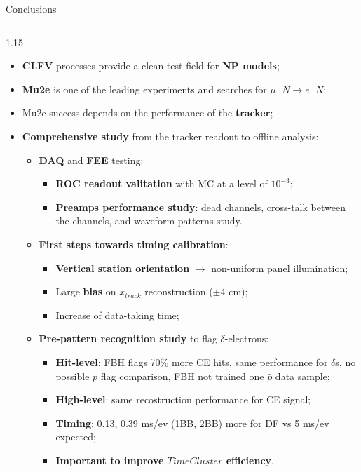 \documentclass{beamer}
\begin{document}
\begin{frame}{Conclusions}
\vspace{-4mm}
\begin{columns}
\begin{column}{1.15\framewidth}
 \setlength{\leftmargini}{1.2em}
    \begin{itemize}
\item \textbf{CLFV} processes provide a clean test field for \textbf{NP models};
\item \textbf{Mu2e} is one of the leading experiments and searches for $\mu^- N \rightarrow e^- N$;
\item Mu2e success depends on the performance of the \textbf{tracker};
    \item \textbf{Comprehensive study} from the tracker readout to offline analysis:
   \begin{itemize}
      \vspace{0.7mm}
   \item \textbf{DAQ} and \textbf{FEE} testing:
   \vspace{0.4mm}
      \begin{itemize}
          
     
    \item \textbf{ROC readout valitation} with MC at a level of $10^{-3}$;
    \item \textbf{Preamps performance study}: dead channels, 
cross-talk between the channels, and waveform patterns study.
 \end{itemize}
    \vspace{0.7mm}
 \item \textbf{First steps towards timing calibration}:
  \vspace{0.4mm}
 \begin{itemize}
     \item \textbf{Vertical station orientation} $\rightarrow$ non-uniform panel illumination;
     \item Large \textbf{bias} on $x_{track}$ reconstruction ($\pm$4 cm);
     \item Increase of data-taking time;
 \end{itemize}
   \vspace{0.7mm}
 \item \textbf{Pre-pattern recognition study} to flag $\delta$-electrons:
  \vspace{0.4mm}
  \begin{itemize}
  \item \textbf{Hit-level}: FBH flags 70\% more CE hits, same performance for $\delta$s, no possible $p$ flag comparison, FBH not trained one $\bar{p}$ data sample;
  \item \textbf{High-level}: same recostruction performance for CE signal;
  \item  \textbf{Timing}: 0.13, 0.39 ms/ev (1BB, 2BB) more for DF vs 5 ms/ev expected;
     \item \textbf{Important to improve $TimeCluster$ efficiency}.
 \end{itemize}
   \end{itemize}
    \end{itemize}
    \end{column}
\end{columns}


\end{frame}
\end{document}
